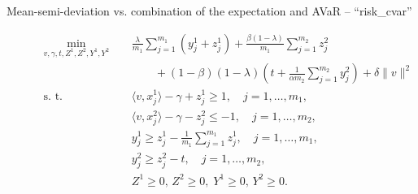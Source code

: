 \documentclass[10pt,letterpaper]{article}
\newcommand{\1}{1{\hskip -2.55 pt}\hbox{I}}
\begin{document}
\begin{description}
  \item[Mean-semi-deviation vs. combination of the expectation and AVaR -- ``risk\_cvar'']
    \begin{equation}
      \label{p:RSSVM-msd-Ecvar}
      \begin{aligned}
      \min_{v,\gamma,t,Z^1,Z^2,Y^1,Y^2}\quad  &\,   \frac{\lambda}{m_1}\sum_{j=1}^{m_1} (y^1_j+z^1_j) + \frac{\beta(1-\lambda)}{m_1}\sum_{j=1}^{m_2} z_j^2\\
              &\, \qquad  + (1-\beta)(1-\lambda)\left(t + \frac{1}{\alpha m_2}\sum_{j=1}^{m_2} y^2_j\right) 
              +\delta\|v\|^2 \\
      \text{s. t. }\quad  &\, \langle v, x^1_j\rangle - \gamma + z_j^1 \ge 1, \quad j=1,\dots,m_1, \\
      &\, \langle v, x^2_{j}\rangle -\gamma  - z_{j}^2 \le -1, \quad j=1,\dots,m_2, \\
      &\, y_j^1 \geq z_j^1-\frac{1}{m_1}\sum_{j=1}^{m_1} z^1_j,\quad j=1,\dots ,m_1,\\
      &\, y_j^2 \geq z_j^2-t,\quad j=1,\dots ,m_2,\\
      &\, Z^1\ge 0,\, Z^2\geq 0,\; Y^1\ge 0,\, Y^2\geq 0. 
      \end{aligned}
    \end{equation}
 


\end{description}
\end{document}
